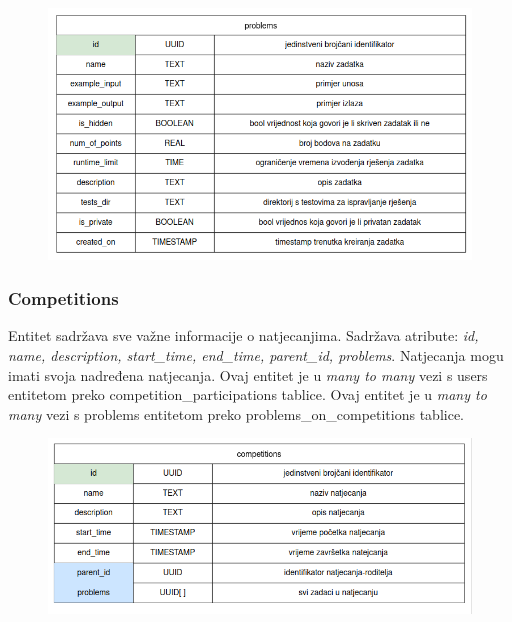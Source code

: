 				\begin{figure}[htbp]
					\centering
					\includegraphics[width=\linewidth]{slike/problems_tablica.png}
				\end{figure}

				\vspace{30mm}

				\subsubsection*{Competitions}

				Entitet  sadržava sve važne informacije o natjecanjima. Sadržava atribute: \textit{id, name, description, start\_time, end\_time, parent\_id, problems}. Natjecanja mogu imati svoja nadređena natjecanja. Ovaj entitet je u \textit{many to many} vezi s users entitetom preko competition\_participations tablice. Ovaj entitet je u \textit{many to many} vezi s problems entitetom preko problems\_on\_competitions tablice.                          
			
				\vspace{20mm}

				\begin{figure}[htbp]
					\centering
					\includegraphics[width=\linewidth]{slike/competitions_tablica.png}
				\end{figure}

